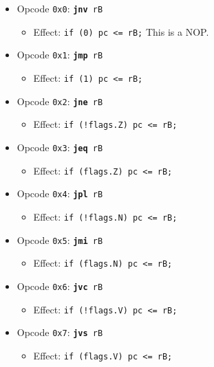 \documentclass{article}
\begin{document}
	\singlespacing
	\begin{itemize}
		\item Opcode \texttt{0x0}:
			\texttt{\textbf{jnv} rB}
		\begin{itemize}
			\item Effect:
				\texttt{if (0) pc <= rB;} This is a NOP.
		\end{itemize}

		\item Opcode \texttt{0x1}:
			\texttt{\textbf{jmp} rB}
		\begin{itemize}
			\item Effect:
				\texttt{if (1) pc <= rB;}
		\end{itemize}

		\item Opcode \texttt{0x2}:
			\texttt{\textbf{jne} rB}
		\begin{itemize}
			\item Effect:
				\texttt{if (!flags.Z) pc <= rB;}
		\end{itemize}

		\item Opcode \texttt{0x3}:
			\texttt{\textbf{jeq} rB}
		\begin{itemize}
			\item Effect:
				\texttt{if (flags.Z) pc <= rB;}
		\end{itemize}

		\item Opcode \texttt{0x4}:
			\texttt{\textbf{jpl} rB}
		\begin{itemize}
			\item Effect:
				\texttt{if (!flags.N) pc <= rB;}
		\end{itemize}

		\item Opcode \texttt{0x5}:
			\texttt{\textbf{jmi} rB}
		\begin{itemize}
			\item Effect:
				\texttt{if (flags.N) pc <= rB;}
		\end{itemize}

		\item Opcode \texttt{0x6}:
			\texttt{\textbf{jvc} rB}
		\begin{itemize}
			\item Effect:
				\texttt{if (!flags.V) pc <= rB;}
		\end{itemize}

		\item Opcode \texttt{0x7}:
			\texttt{\textbf{jvs} rB}
		\begin{itemize}
			\item Effect:
				\texttt{if (flags.V) pc <= rB;}
		\end{itemize}


\end{itemize}
\end{document}

